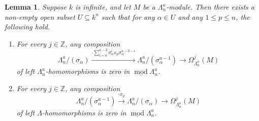 \documentclass[a4paper]{amsart}
\newtheorem{lemma}[theorem]{Lemma}
\theoremstyle{definition}
\theoremstyle{definition}
\theoremstyle{definition}
\theoremstyle{definition}
\theoremstyle{definition}
\theoremstyle{definition}
\theoremstyle{remark}
\theoremstyle{remark}
\theoremstyle{definition}
\theoremstyle{definition}
\begin{document}
\begin{lemma}\label{factoring}
Suppose $k$ is infinite, and let $M$ be a $\Lambda^a_n$-module. Then
there exists a non-empty open subset $U \subseteq k^n$ such that for
any $\alpha \in U$ and any $1 \le p \le n$, the following hold.
\begin{enumerate}
\item[(i)] For every $j \in \mathbb{Z}$, any composition
$$\Lambda^a_n / ( \sigma_{\alpha} ) \xrightarrow{\cdot \sum_{i=0}^{a-2}
\sigma_{\alpha}^i x_p \sigma_{\alpha}^{a-2-i}} \Lambda^a_n / (
\sigma_{\alpha}^{a-1} ) \to \Omega_{\Lambda^a_n}^j(M)$$ of left
$\Lambda^a_n$-homomorphisms is zero in $\underline{\operatorname{mod}\nolimits}
\Lambda^a_n$.
\item [(ii)] For every $j \in \mathbb{Z}$, any composition
$$\Lambda^a_n / ( \sigma_{\alpha}^{a-1} ) \xrightarrow{\cdot
x_p} \Lambda^a_n / ( \sigma_{\alpha} ) \to
\Omega_{\Lambda^a_n}^j(M)$$ of left $\Lambda$-homomorphisms is zero
in $\underline{\operatorname{mod}\nolimits} \Lambda^a_n$.
\end{enumerate}
\end{lemma}
\end{document}
